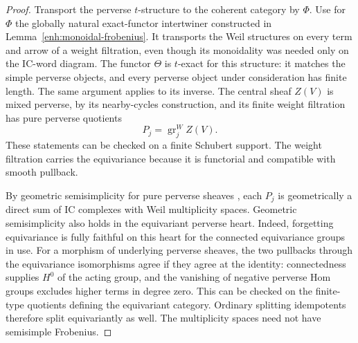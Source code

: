 \documentclass[11pt]{article}
\numberwithin{equation}{section}
\theoremstyle{definition}
\theoremstyle{remark}
\begin{document}
\begin{proof}
Transport the perverse $t$-structure to the coherent category by $\Phi$.
Use for $\Phi$ the globally natural exact-functor intertwiner
constructed in Lemma~\ref{enh:monoidal-frobenius}.  It transports
the Weil structures on every term and arrow of a weight filtration,
even though its monoidality was needed only on the IC-word diagram.
The functor $\Theta$ is $t$-exact for this structure: it matches the
simple perverse objects, and every perverse object under consideration
has finite length.  The same argument applies to its inverse.
The central sheaf $Z(V)$ is mixed perverse, by its nearby-cycles
construction, and its finite weight filtration has pure perverse
quotients
\[
 P_j=\operatorname{gr}_j^W Z(V).
\]
These statements can be checked on a finite Schubert support.  The
weight filtration carries the equivariance because it is functorial
and compatible with smooth pullback.

By geometric semisimplicity for pure perverse sheaves
\cite[Th\'eor\`eme~5.3.8]{Enh:BBD}, each $P_j$ is geometrically a direct
sum of IC complexes with Weil multiplicity spaces.  Geometric semisimplicity also holds in the
equivariant perverse heart.  Indeed, forgetting equivariance is fully
faithful on this heart for the connected equivariance groups in use.
For a morphism of underlying perverse sheaves, the two pullbacks through
the equivariance isomorphisms agree if they agree at the identity:
connectedness supplies $H^0$ of the acting group, and the vanishing of
negative perverse Hom groups excludes higher terms in degree zero.
This can be checked on the finite-type quotients defining the
equivariant category.  Ordinary splitting idempotents therefore split
equivariantly as well.  The multiplicity spaces need not have
semisimple Frobenius.


\end{proof}
\end{document}
